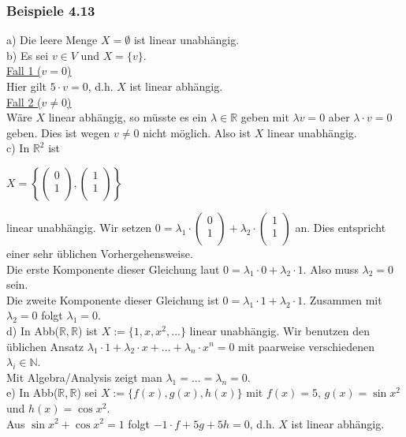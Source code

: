 \documentclass{article}
\begin{document}
\subsubsection*{Beispiele 4.13}
a) Die leere Menge $X = \emptyset$ ist linear unabhängig. \\
b) Es sei $v \in V$ und $X = \{v\}$. \\
\underline{Fall 1 ($v = 0$)} \\
Hier gilt $5 \cdot v = 0$, d.h. $X$ ist linear abhängig. \\
\underline{Fall 2 ($v \neq 0$)} \\
Wäre $X$ linear abhängig, so müsste es ein $\lambda \in \mathbb{R}$ geben mit $\lambda v = 0$ aber $\lambda \cdot v = 0$ geben. Dies ist wegen $v \neq 0$ nicht möglich. Also ist $X$ linear unabhängig. \\
c) In $\mathbb{R}^2$  ist \\
\begin{center}
    $X = \left\{ \begin{pmatrix}
        0 \\
        1 \\
    \end{pmatrix}, \begin{pmatrix}
        1 \\
        1 \\
    \end{pmatrix} \right\}$ \\
\end{center}
linear unabhängig. Wir setzen $0 = \lambda_1 \cdot \begin{pmatrix}
    0 \\
    1 \\
\end{pmatrix} + \lambda_2 \cdot \begin{pmatrix}
    1 \\
    1 \\
    \end{pmatrix}$
an. Dies entspricht einer sehr üblichen Vorhergehensweise. \\
Die erste Komponente dieser Gleichung laut $0 = \lambda_1 \cdot 0 + \lambda_2 \cdot 1$. Also muss $\lambda_2 = 0$ sein. \\
Die zweite Komponente dieser Gleichung ist $0 = \lambda_1 \cdot 1 + \lambda_2 \cdot 1$. Zusammen mit $\lambda_2 = 0$ folgt $\lambda_1 = 0$. \\
d) In Abb($\mathbb{R}, \mathbb{R}$) ist $X:= \{1, x, x^2, ...\}$ linear unabhängig. Wir benutzen den üblichen Ansatz $\lambda_1 \cdot 1 + \lambda_2 \cdot x + ... + \lambda_n \cdot x^n = 0$ mit paarweise verschiedenen $\lambda_i \in \mathbb{N}$. \\
Mit Algebra/Analysis zeigt man $\lambda_1 = ... = \lambda_n = 0$. \\
e) In Abb($\mathbb{R}, \mathbb{R}$) sei $X := \{f(x), g(x), h(x)\}$ mit $f(x)=5$, $g(x)=\sin x^2$ und $h(x)=\cos x^2$. \\
Aus $\sin x^2 + \cos x^2 = 1$ folgt $-1 \cdot f + 5g + 5h = 0$, d.h. $X$ ist linear abhängig. \\
\\
\end{document}
